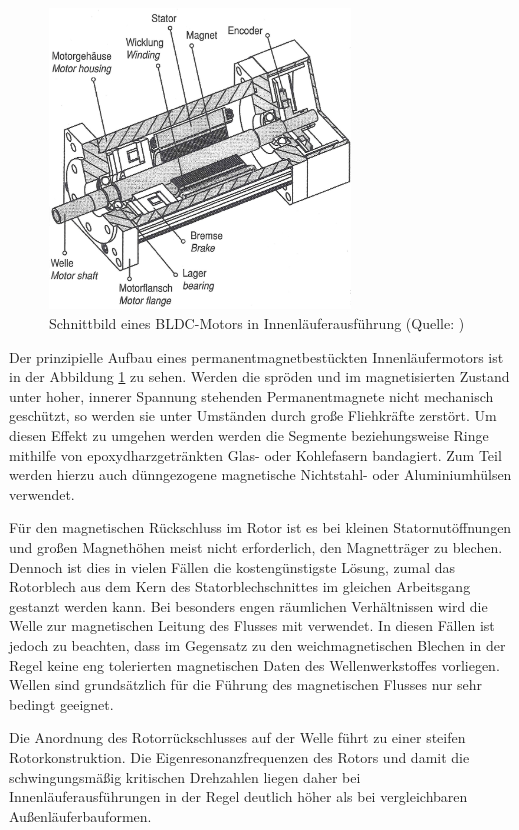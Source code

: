 \begin{figure}[h]
    \centering
    \includegraphics[width=8cm]{./Grafiken/3_1}
    \caption[Schnittbild eines BLDC-Motors in Innenläuferausführung]{Schnittbild eines BLDC-Motors in Innenläuferausführung (Quelle: \parencite[S. 75]{Stölting2011})}
    \label{fig:3_1}
  \end{figure}

Der prinzipielle Aufbau eines permanentmagnetbestückten Innenläufermotors ist in der Abbildung \ref{fig:3_1} zu sehen. Werden die spröden und im magnetisierten Zustand unter hoher, innerer Spannung stehenden Permanentmagnete nicht mechanisch geschützt, so werden sie unter Umständen durch große Fliehkräfte zerstört. Um diesen Effekt zu umgehen werden werden die Segmente beziehungsweise Ringe mithilfe von epoxydharzgetränkten Glas- oder Kohlefasern bandagiert. Zum Teil werden hierzu auch dünngezogene magnetische Nichtstahl- oder Aluminiumhülsen verwendet.

Für den magnetischen Rückschluss im Rotor ist es bei kleinen Statornutöffnungen und großen Magnethöhen meist nicht erforderlich, den Magnetträger zu blechen. Dennoch ist dies in vielen Fällen die kostengünstigste Lösung, zumal das Rotorblech aus dem Kern des Statorblechschnittes im gleichen Arbeitsgang gestanzt werden kann. Bei besonders engen räumlichen Verhältnissen wird die Welle zur magnetischen Leitung des Flusses mit verwendet. In diesen Fällen ist jedoch zu beachten, dass im Gegensatz zu den weichmagnetischen Blechen in der Regel keine eng tolerierten magnetischen Daten des Wellenwerkstoffes vorliegen. Wellen sind grundsätzlich für die Führung des magnetischen Flusses nur sehr bedingt geeignet.

Die Anordnung des Rotorrückschlusses auf der Welle führt zu einer steifen Rotorkonstruktion. Die Eigenresonanzfrequenzen des Rotors und damit die schwingungsmäßig kritischen Drehzahlen liegen daher bei Innenläuferausführungen in der Regel deutlich höher als bei vergleichbaren Außenläuferbauformen.

